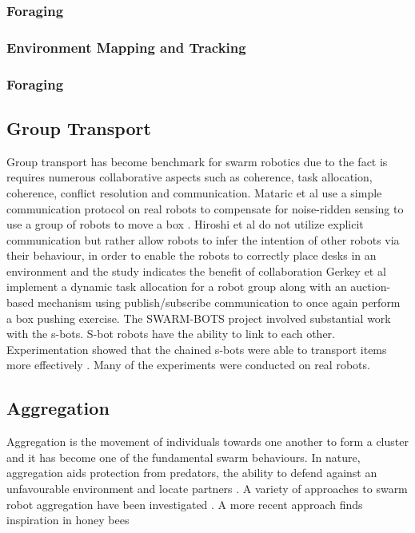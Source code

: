 \subsubsection{Foraging}
\subsubsection{Environment Mapping and Tracking}



\subsubsection{Foraging}
\subsection{Group Transport}

Group transport has become benchmark for swarm robotics due to the fact is requires numerous collaborative aspects such as coherence, task allocation, coherence, conflict resolution and communication. Mataric et al use a simple communication protocol on real robots to compensate for noise-ridden sensing to use a group of robots to move a box \cite{mataric1995cooperative}. Hiroshi et al do not utilize explicit communication but rather allow robots to infer the intention of other robots via their behaviour, in order to enable the robots to correctly place desks in an environment and the study indicates the benefit of collaboration \cite{sugie1995placing}
Gerkey et al implement a dynamic task allocation for a robot group along with an auction-based mechanism using publish/subscribe communication to once again perform a box pushing exercise. \cite{gerkey2002sold}
The SWARM-BOTS project involved substantial work with the s-bots. S-bot robots have the ability to link to each other. Experimentation showed that the chained s-bots were able to transport items more effectively \cite{gross2004group, dorigo2005swarm}. Many of the experiments were conducted on real robots. 

\subsection{Aggregation}
Aggregation is the movement of individuals towards one another to form a cluster and it has become one of the fundamental swarm behaviours. In nature, aggregation aids protection from predators, the ability to defend against an unfavourable environment and locate partners \cite{bonabeau2001self}. A variety of approaches to swarm robot aggregation have been investigated \cite{yan2011algorithm, soysal2007aggregation, trianni2003evolving, dimarogonas2008connectedness }. A more recent approach finds inspiration in honey bees \cite{schmickl2011beeclust, schmickl2009two}

